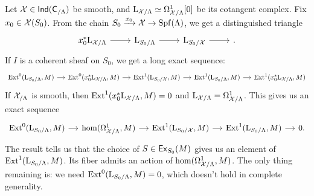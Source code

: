 \documentclass[phd,cornellheadings,draft]{cornell}
\begin{document}
Let $\mathcal{X}\in \operatorname{\mathsf{Ind}}(\mathsf{C}_{/\Lambda})$ be smooth, and 
$\mathrm{L}_{\mathcal{X}/\Lambda}\simeq \Omega_{\mathcal{X}/\Lambda}^1[0]$ be its cotangent complex. 
Fix $x_0\in \mathcal{X}(S_0)$. From the chain 
$S_0\xrightarrow{x_0} \mathcal{X} \to \operatorname{Spf}(\Lambda)$, we get a distinguished triangle 
\cite[II 2.1.5.6]{illusie-1971}
\[
\begin{tikzcd}
	x_0^\ast \LL_{\cX/\Lambda} \ar[r]
		& \LL_{S_0/\Lambda} \ar[r]
		& \LL_{S_0/\cX} \ar[r] 
		& {} .
\end{tikzcd}
\]
If $I$ is a coherent sheaf on $S_0$, we get a long exact sequence:
\[
\begin{tikzcd}[column sep=small]
	\ext^0(\LL_{S_0/\Lambda},M) \ar[r]
		& \ext^0(x_0^\ast \LL_{\cX/\Lambda},M) \ar[r]
		& \ext^1(\LL_{S_0/\cX},M) \ar[r]
		& \ext^1(\LL_{S_0/\Lambda},M) \ar[r]
		& \ext^1(x_0^\ast \LL_{\cX/\Lambda},M)
\end{tikzcd}
\]
If $\mathcal{X}_{/\Lambda}$ is smooth, then $\operatorname{Ext}^1(x_0^\ast\mathrm{L}_{\mathcal{X}/\Lambda},M)=0$ and 
$\mathrm{L}_{\mathcal{X}/\Lambda} = \Omega_{\mathcal{X}/\Lambda}^1$. This gives us an exact sequence 
\[
\begin{tikzcd}[column sep=small]
	\ext^0(\LL_{S_0/\Lambda},M) \ar[r]
		& \hom(\Omega_{\cX/\Lambda}^1,M) \ar[r]
		& \ext^1(\LL_{S_0/\cX},M) \ar[r]
		& \ext^1(\LL_{S_0/\Lambda},M) \ar[r]
		& 0 .
\end{tikzcd}
\]
The result \cite[III 2.1.7]{illusie-1971} tells us that the choice of 
$S\in \mathsf{Ex}_{S_0}(M)$ gives us an element of $\operatorname{Ext}^1(\mathrm{L}_{S_0/\Lambda},M)$. 
Its fiber admits an action of $\hom(\Omega_{\mathcal{X}/\Lambda}^1,M)$. The only thing 
remaining is: we need $\operatorname{Ext}^0(\mathrm{L}_{S_0/\Lambda},M)=0$, which doesn't hold in 
complete generality. 





\printbibliography
\end{document}
